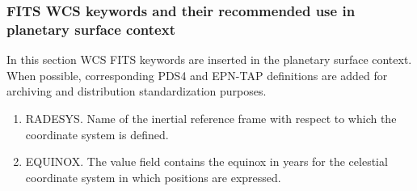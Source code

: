 \subsubsection{FITS WCS keywords and their recommended use in planetary surface context}
\label{sssec:wcskeys}
In this section WCS FITS keywords are inserted in the planetary surface context.
When possible, corresponding PDS4 and EPN-TAP definitions are added for archiving
and distribution standardization purposes.
\begin{enumerate}
\item{RADESYS.
Name of the inertial reference frame with respect to which the coordinate
system is defined\DIFdelbegin {}\DIFdelendFL.
\DIFaddbegin {} \DIFaddendFL
}
\item{EQUINOX.
The value field contains the equinox in years for the celestial
coordinate system in which positions are expressed\DIFdelbegin {}\DIFdelendFL.
}
\end{enumerate}
